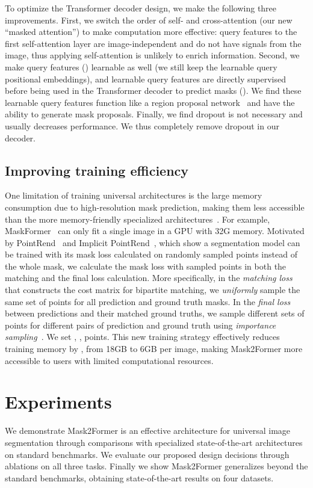 \documentclass[10pt,twocolumn,letterpaper]{article}
\newcommand{\modelname}{Mask2Former\xspace}
\begin{document}
To optimize the Transformer decoder design, we make the following three improvements. First, we switch the order of self- and cross-attention (our new ``masked attention'') to make computation more effective: query features to the first self-attention layer are image-independent and do not have signals from the image, thus applying self-attention is unlikely to enrich information. Second, we make query features () learnable as well (we still keep the learnable query positional embeddings), and learnable query features are directly supervised before being used in the Transformer decoder to predict masks (). We find these learnable query features function like a region proposal network~\cite{Ren2015a} and have the ability to generate mask proposals. Finally, we find dropout is not necessary and usually decreases performance. We thus  completely remove dropout in our decoder.


\subsection{Improving training efficiency}
\label{sec:method:arch:loss}


One limitation of training universal architectures is the large memory consumption due to high-resolution mask prediction, making them less accessible than the more memory-friendly specialized architectures~\cite{he2017mask,chen2019hybrid}. For example, MaskFormer~\cite{cheng2021maskformer} can only fit a single image in a GPU with 32G memory. Motivated by PointRend~\cite{kirillov2020pointrend} and Implicit PointRend~\cite{cheng2021pointly}, which show a segmentation model can be trained with its mask loss calculated on  randomly sampled points instead of the whole mask, we calculate the mask loss with sampled points in both the matching and the final loss calculation. More specifically, in the \emph{matching loss} that constructs the cost matrix for bipartite matching, we \emph{uniformly} sample the same set of  points for all prediction and ground truth masks. In the \emph{final loss} between predictions and their matched ground truths, we sample different sets of  points for different pairs of prediction and ground truth using \emph{importance sampling}~\cite{kirillov2020pointrend}. We set , \ie,  points. This new training strategy effectively reduces training memory by , from 18GB to 6GB per image, making \modelname more accessible to users with limited computational resources. \section{Experiments}
We demonstrate \modelname is an effective architecture for  universal image segmentation  through comparisons with specialized state-of-the-art architectures on  standard benchmarks.
We evaluate our proposed design decisions through ablations on all three tasks.
Finally we show \modelname generalizes beyond the standard benchmarks,
obtaining state-of-the-art results on four datasets.
\end{document}

